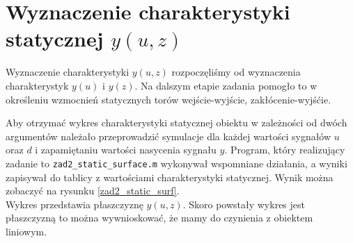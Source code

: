 \section{Wyznaczenie charakterystyki statycznej $y(u,z)$}
Wyznaczenie charakterystyki $y(u,z)$ rozpoczęliśmy od wyznaczenia charakterystyk $y(u)$ i $y(z)$. 
Na dalszym etapie zadania pomogło to w określeniu wzmocnień statycznych torów wejście-wyjście, zakłócenie-wyjśćie. 

Aby otrzymać wykres charakterystyki statycznej obiektu w zależności od 
dwóch argumentów należało przeprowadzić symulacje dla każdej 
wartości sygnałów $u$ oraz $d$ i zapamiętaniu wartości 
nasycenia sygnału $y$. Program, który realizujący zadanie to 
\verb+zad2_static_surface.m+ wykonywał wspomniane działania, 
a wyniki zapisywał do tablicy z wartościami charakterystyki statycznej. 
Wynik można zobaczyć na rysunku \ref{zad2_static_surf}.\\
\indent{} Wykres przedstawia płaszczyznę $y(u,z)$. Skoro powstały wykres 
jest płaszczyzną to można wywnioskować, że mamy do czynienia z obiektem liniowym. 

